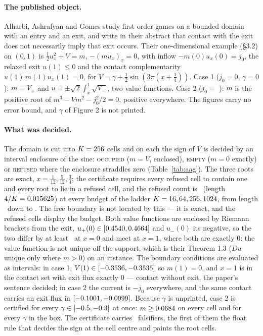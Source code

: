 \documentclass[11pt]{article}
\begin{document}
\paragraph{The published object.} Alharbi, Ashrafyan and Gomes \cite{AAG26} study first-order games on a bounded domain with an entry and an exit, and write in their abstract that contact with the exit does not necessarily imply that exit occurs. Their one-dimensional example (\S3.2) on $(0, 1)$ is $\tfrac12 u_x^2 + V = m$, $-(m u_x)_x = 0$, with inflow $-m(0)u_x(0) = j_0$, the relaxed exit $u(1) \le 0$ and the contact complementarity $u(1)\,m(1)u_x(1) = 0$, for $V = \gamma + \tfrac12\sin(3\pi(x + \tfrac14))$. Case 1 ($j_0 = 0$, $\gamma = 0$): $m = V_+$ and $u = \pm\sqrt2\int_x^1\sqrt{V_-}$, two value functions. Case 2 ($j_0 = $ \AAGjZero): $m$ is the positive root of $m^3 - Vm^2 - j_0^2/2 = 0$, positive everywhere. The figures carry no error bound, and $\gamma$ of Figure 2 is not printed.

\paragraph{What was decided.} The domain is cut into $K = 256$ cells and on each the sign of $V$ is decided by an interval enclosure of the sine: \textsc{occupied} ($m = V$, enclosed), \textsc{empty} ($m = 0$ exactly) or \textsc{refused} where the enclosure straddles zero (Table~\ref{tab:aag}). The three roots are exact, $x = \tfrac1{12}, \tfrac5{12}, \tfrac34$; the certificate requires every refused cell to contain one and every root to lie in a refused cell, and the refused count is \AAGRefused\ (length $4/K = 0.015625$) at every budget of the ladder $K = 16, 64, 256, 1024$, from length \AAGLadderFirstLength\ down to \AAGLadderLastLength. The free boundary is not located by this --- it is exact, and the refused cells display the budget. Both value functions are enclosed by Riemann brackets from the exit, $u_+(0) \in [0.4540, 0.4664]$ and $u_-(0)$ its negative, so the two differ by at least \AAGuGapZero\ at $x = 0$ and meet at $x = 1$, where both are exactly $0$: the value function is not unique off the support, which is their Theorem 1.3 ($Du$ unique only where $m > 0$) on an instance. The boundary conditions are evaluated as intervals: in case 1, $V(1) \in [-0.3536, -0.3535]$ so $m(1) = 0$, and $x = 1$ is in the contact set with exit flux exactly $0$ --- contact without exit, the paper's sentence decided; in case 2 the current is $-j_0$ everywhere, and the same contact carries an exit flux in $[-0.1001, -0.0999]$. Because $\gamma$ is unprinted, case 2 is certified for every $\gamma \in [-0.5, -0.3]$ at once: $m \ge 0.0684$ on every cell and for every $\gamma$ in the box. The certificate carries \AAGFalsifiers\ falsifiers, the first of them the float rule that decides the sign at the cell centre and paints the root cells.
\end{document}
